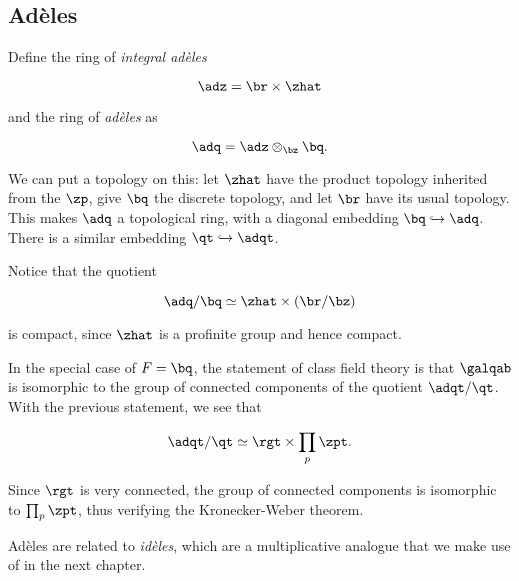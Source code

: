 \subsection{Ad\`eles }
\label{sec:ad\`eles}

Define the ring of \textit{integral ad\`eles}

\[ \adz = \br \times \zhat \]

and the ring of \textit{ad\`eles} as

\[ \adq = \adz \otimes_\bz \bq. \]

We can put a topology on this: let $\zhat$ have the product topology inherited
from the $\zp$, give $\bq$ the discrete topology, and let $\br$ have its usual
topology. This makes $\adq$ a topological ring, with a diagonal embedding
$\bq\hookrightarrow\adq$. There is a similar embedding $\qt \hookrightarrow \adqt$.

Notice that the quotient

\[ \adq/\bq \simeq \zhat \times (\br/\bz) \]

is compact, since $\zhat$ is a profinite group and hence compact.

In the special case of $F=\bq$, the statement of class field theory is that
$\galqab$ is isomorphic to the group of connected components of the quotient
$\adqt/\qt$. With the previous statement, we see that

\[ \adqt/
  \qt
  \simeq \rgt \times \prod_p \zpt. \]

Since $\rgt$ is very connected, the group of connected components is isomorphic
to $\prod_p \zpt$, thus verifying the Kronecker-Weber theorem.

Ad\`eles are related to \textit{id\`eles}, which are a multiplicative analogue that
we make use of in the next chapter.


